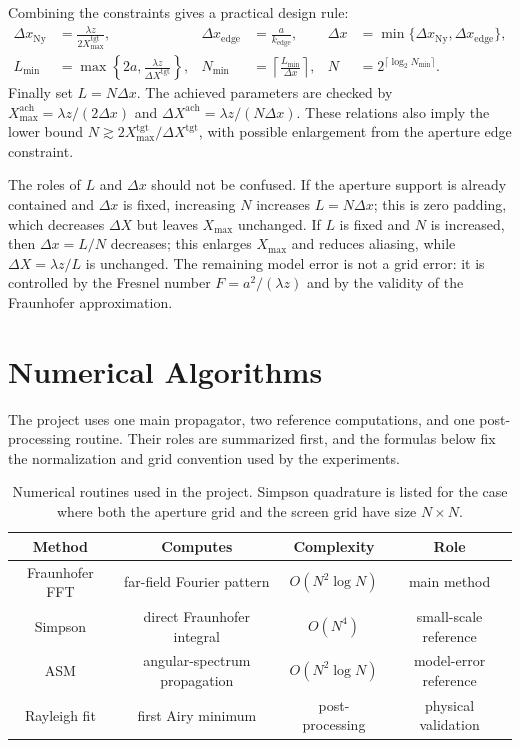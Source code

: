 \documentclass[12pt]{article}
\begin{document}
Combining the constraints gives a practical design rule:
\[
\begin{aligned}
    \Delta x_{\mathrm{Ny}}&=\frac{\lambda z}{2X_{\max}^{\mathrm{tgt}}},
    &\Delta x_{\mathrm{edge}}&=\frac{a}{k_{\mathrm{edge}}},
    &\Delta x&=\min\{\Delta x_{\mathrm{Ny}},\Delta x_{\mathrm{edge}}\},\\
    L_{\min}&=\max\left\{2a,\frac{\lambda z}{\Delta X^{\mathrm{tgt}}}\right\},
    &N_{\min}&=\left\lceil\frac{L_{\min}}{\Delta x}\right\rceil,
    &N&=2^{\lceil\log_2 N_{\min}\rceil}.
\end{aligned}
\]
Finally set \(L=N\Delta x\). The achieved parameters are checked by
\(X_{\max}^{\mathrm{ach}}=\lambda z/(2\Delta x)\) and
\(\Delta X^{\mathrm{ach}}=\lambda z/(N\Delta x)\). These relations also imply the lower bound
\(N\gtrsim 2X_{\max}^{\mathrm{tgt}}/\Delta X^{\mathrm{tgt}}\), with possible enlargement from the aperture
edge constraint.

The roles of \(L\) and \(\Delta x\) should not be confused. If the aperture support is already contained
and \(\Delta x\) is fixed, increasing \(N\) increases \(L=N\Delta x\); this is zero padding, which decreases
\(\Delta X\) but leaves \(X_{\max}\) unchanged. If \(L\) is fixed and \(N\) is increased, then
\(\Delta x=L/N\) decreases; this enlarges \(X_{\max}\) and reduces aliasing, while \(\Delta X=\lambda z/L\)
is unchanged. The remaining model error is not a grid error: it is controlled by the Fresnel number
\(F=a^2/(\lambda z)\) and by the validity of the Fraunhofer approximation.

\section{Numerical Algorithms}

The project uses one main propagator, two reference computations, and one post-processing routine. Their
roles are summarized first, and the formulas below fix the normalization and grid convention used by the
experiments.

\begin{table}[H]
\centering
\footnotesize
\begin{tabular}{c|c|c|c}
Method & Computes & Complexity & Role \\
\hline
Fraunhofer FFT & far-field Fourier pattern & \(O(N^2\log N)\) & main method \\
Simpson & direct Fraunhofer integral & \(O(N^4)\) & small-scale reference \\
ASM & angular-spectrum propagation & \(O(N^2\log N)\) & model-error reference \\
Rayleigh fit & first Airy minimum & post-processing & physical validation
\end{tabular}
\caption{Numerical routines used in the project. Simpson quadrature is listed for the case where both the
aperture grid and the screen grid have size \(N\times N\).}
\label{tab:algorithms}
\end{table}
\end{document}
